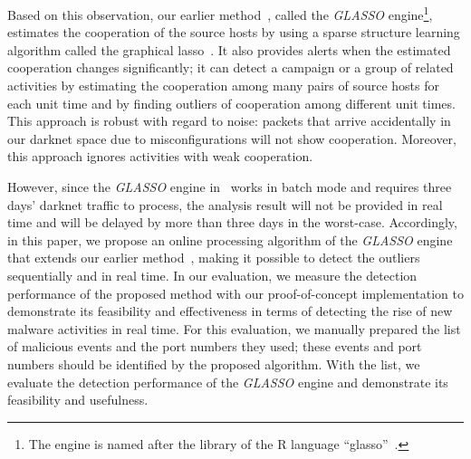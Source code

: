 \documentclass[conference]{IEEEtran}
\begin{document}
Based on this observation, our earlier method~\cite{Han}, called the \textit{GLASSO} engine\footnote{The engine is named after the library of the R language ``glasso''~\cite{Friedman_glasso}.}, estimates the cooperation of the source hosts by using a sparse structure learning algorithm called the graphical lasso~\cite{Friedman}.
It also provides alerts when the estimated cooperation changes significantly; it can detect a campaign or a group of related activities by estimating the cooperation among many pairs of source hosts for each unit time and by finding outliers of cooperation among different unit times.
This approach is robust with regard to noise: packets that arrive accidentally in our darknet space due to misconfigurations will not show cooperation.
Moreover, this approach ignores activities with weak cooperation.

However, since the \textit{GLASSO} engine in~\cite{Han} works in batch mode and requires three days' darknet traffic to process, the analysis result will not be provided in real time and will be delayed by more than three days in the worst-case.
Accordingly, in this paper, we propose an online processing algorithm of the \textit{GLASSO} engine that extends our earlier method~\cite{Han}, making it possible to detect the outliers sequentially and in real time.
In our evaluation, we measure the detection performance of the proposed method with our proof-of-concept implementation to demonstrate its feasibility and effectiveness in terms of detecting the rise of new malware activities in real time.
For this evaluation, we manually prepared the list of malicious events and the port numbers they used; these events and port numbers should be identified by the proposed algorithm.
With the list, we evaluate the detection performance of the \textit{GLASSO} engine and demonstrate its feasibility and usefulness.
\end{document}
